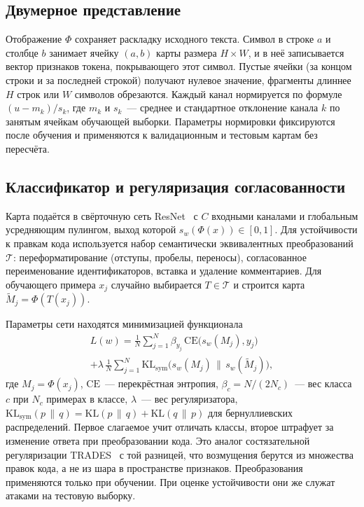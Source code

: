 \documentclass{misisarticle}
\begin{document}
\subsection{Двумерное представление}

Отображение $\Phi$ сохраняет раскладку исходного текста. Символ в строке $a$ и столбце $b$ занимает ячейку $(a, b)$ карты размера $H \times W$, и в неё записывается вектор признаков токена, покрывающего этот символ. Пустые ячейки (за концом строки и за последней строкой) получают нулевое значение, фрагменты длиннее $H$ строк или $W$ символов обрезаются. Каждый канал нормируется по формуле $(u - m_k)/s_k$, где $m_k$ и $s_k$~--- среднее и стандартное отклонение канала $k$ по занятым ячейкам обучающей выборки. Параметры нормировки фиксируются после обучения и применяются к валидационным и тестовым картам без пересчёта.

\subsection{Классификатор и регуляризация согласованности}

Карта подаётся в свёрточную сеть ResNet~\cite{resnet} с $C$ входными каналами и глобальным усредняющим пулингом, выход которой $s_w(\Phi(x)) \in [0, 1]$. Для устойчивости к правкам кода используется набор семантически эквивалентных преобразований $\mathcal{T}$: переформатирование (отступы, пробелы, переносы), согласованное переименование идентификаторов, вставка и удаление комментариев. Для обучающего примера $x_j$ случайно выбирается $T \in \mathcal{T}$ и строится карта $\tilde{M}_j = \Phi(T(x_j))$.

Параметры сети находятся минимизацией функционала
\begin{multline}
  L(w) = \frac{1}{N}\sum_{j=1}^{N} \beta_{y_j}\,\mathrm{CE}\bigl(s_w(M_j), y_j\bigr) \\
  + \lambda\, \frac{1}{N}\sum_{j=1}^{N} \mathrm{KL}_{\mathrm{sym}}\bigl(s_w(M_j) \,\|\, s_w(\tilde{M}_j)\bigr),
  \label{eq:loss}
\end{multline}
где $M_j = \Phi(x_j)$, $\mathrm{CE}$~--- перекрёстная энтропия, $\beta_c = N / (2 N_c)$~--- вес класса $c$ при $N_c$ примерах в классе, $\lambda$~--- вес регуляризатора, $\mathrm{KL}_{\mathrm{sym}}(p\,\|\,q) = \mathrm{KL}(p\,\|\,q) + \mathrm{KL}(q\,\|\,p)$ для бернуллиевских распределений. Первое слагаемое учит отличать классы, второе штрафует за изменение ответа при преобразовании кода. Это аналог состязательной регуляризации TRADES~\cite{trades} с той разницей, что возмущения берутся из множества правок кода, а не из шара в пространстве признаков. Преобразования применяются только при обучении. При оценке устойчивости они же служат атаками на тестовую выборку.
\end{document}
